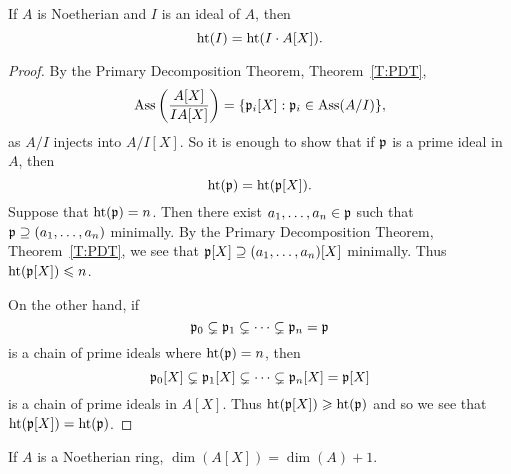 \documentclass{ximera}
\begin{document}
\begin{lemma}\label{L:FT2} If $A$ is Noetherian and $I$ is an ideal of $A$, then
\[
\operatorname{ht}(I) = \operatorname{ht}(I\cdot A[X]).
\]
\end{lemma}

\begin{proof} By the Primary Decomposition Theorem, Theorem~\ref{T:PDT}, 
\[
\operatorname{Ass}\left(\frac{A[X]}{IA[X]}\right) = \{\mathfrak{p}_i[X]: \mathfrak{p}_i\in\operatorname{Ass}(A/I)\},
\]
as $A/I$ injects into $A/I [X]$. So it is enough to show that if $\mathfrak{p}$ is a prime ideal in $A$, then 
\[
\operatorname{ht}(\mathfrak{p}) = \operatorname{ht}(\mathfrak{p}[X]).
\]
Suppose that $\operatorname{ht}(\mathfrak{p}) = n$. Then there exist $a_1,\dots,a_n\in \mathfrak{p}$ such that $\mathfrak{p}\supseteq(a_1,\dots,a_n)$ minimally. By the Primary Decomposition Theorem, Theorem~\ref{T:PDT}, we see that $\mathfrak{p}[X]\supseteq(a_1,\dots,a_n)[X]$ minimally. Thus $\operatorname{ht}(\mathfrak{p}[X])\leqslant n$.

On the other hand, if 
\[
\mathfrak{p}_0 \subsetneq \mathfrak{p}_1 \subsetneq \cdots \subsetneq \mathfrak{p}_n = \mathfrak{p}
\] 
is a chain of prime ideals where $\operatorname{ht}(\mathfrak{p}) = n$, then 
\[
\mathfrak{p}_0[X] \subsetneq \mathfrak{p}_1[X] \subsetneq \cdots \subsetneq \mathfrak{p}_n[X] = \mathfrak{p}[X]
\]
is a chain of prime ideals in $A[X]$. Thus $\operatorname{ht}(\mathfrak{p}[X])\geqslant \operatorname{ht}(\mathfrak{p})$ and so we see that $\operatorname{ht}(\mathfrak{p}[X]) = \operatorname{ht}(\mathfrak{p})$. 
\end{proof}


\begin{theorem} If $A$ is a Noetherian ring, $\dim(A[X]) = \dim(A) + 1$.
\end{theorem}
\end{document}
